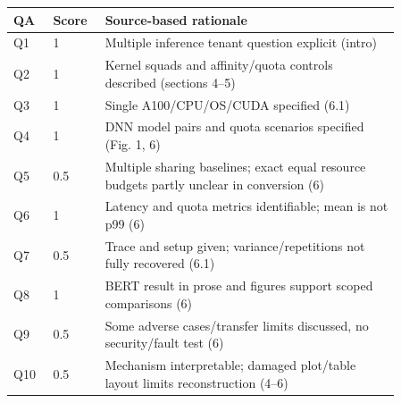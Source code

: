 \begin{longtable}{P{0.09\linewidth}P{0.10\linewidth}P{0.67\linewidth}}
\toprule QA & Score & Source-based rationale\\\midrule\endhead
Q1 & 1 & Multiple inference tenant question explicit (intro)\\
Q2 & 1 & Kernel squads and affinity/quota controls described (sections 4–5)\\
Q3 & 1 & Single A100/CPU/OS/CUDA specified (6.1)\\
Q4 & 1 & DNN model pairs and quota scenarios specified (Fig. 1, 6)\\
Q5 & 0.5 & Multiple sharing baselines; exact equal resource budgets partly unclear in conversion (6)\\
Q6 & 1 & Latency and quota metrics identifiable; mean is not p99 (6)\\
Q7 & 0.5 & Trace and setup given; variance/repetitions not fully recovered (6.1)\\
Q8 & 1 & BERT result in prose and figures support scoped comparisons (6)\\
Q9 & 0.5 & Some adverse cases/transfer limits discussed, no security/fault test (6)\\
Q10 & 0.5 & Mechanism interpretable; damaged plot/table layout limits reconstruction (4–6)\\
\bottomrule\end{longtable}


